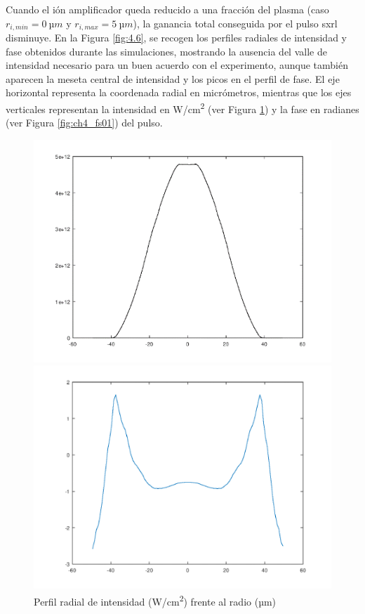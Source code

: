 Cuando el ión amplificador queda reducido a una fracción del plasma (caso $r_{i,min}=\qty{0}{µm}$ y $r_{i,max}=\qty{5}{µm}$), la ganancia total conseguida por el pulso \acrshort{sxrl} disminuye. En la Figura \ref{fig:4.6}, se recogen los perfiles radiales de intensidad y fase obtenidos durante las simulaciones, mostrando la ausencia del valle de intensidad necesario para un buen acuerdo con el experimento, aunque también aparecen la meseta central de intensidad y los picos en el perfil de fase. El eje horizontal representa la coordenada radial en micrómetros, mientras que los ejes verticales representan la intensidad en \unit{W/cm^2} (ver Figura \ref{fig:ch4_int01}) y la fase en radianes (ver Figura \ref{fig:ch4_fs01}) del pulso.

\begin{figure}[htbp]
  \centering
  \begin{subcaptionblock}{.4\textwidth}
    \centering
    \includegraphics[width=\textwidth]{Figuras/ch4_int01.png}
    \caption{Perfil radial de intensidad (\unit{W/cm^2}) frente al radio (\unit{µm})}\label{fig:ch4_int01}
  \end{subcaptionblock}
  \begin{subcaptionblock}{.4\textwidth}
    \centering
    \includegraphics[width=\textwidth]{Figuras/ch4_fs01.png}

\end{subcaptionblock}
\end{figure}
